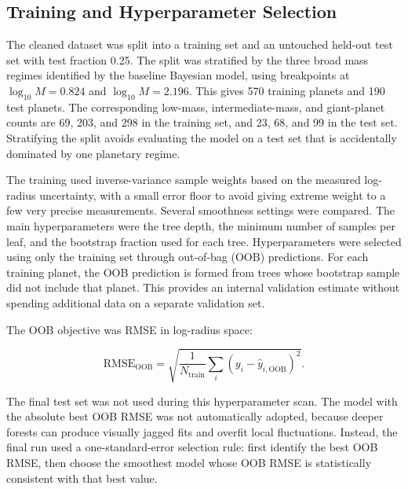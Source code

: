 \documentclass{article}
\numberwithin{equation}{section}
\begin{document}
\subsection{Training and Hyperparameter Selection}

The cleaned dataset was split into a training set and an untouched held-out test set with test fraction 0.25. The split was stratified by the three broad mass regimes identified by the baseline Bayesian model, using breakpoints at $\log_{10}M=0.824$ and $\log_{10}M=2.196$. This gives 570 training planets and 190 test planets. The corresponding low-mass, intermediate-mass, and giant-planet counts are 69, 203, and 298 in the training set, and 23, 68, and 99 in the test set. Stratifying the split avoids evaluating the model on a test set that is accidentally dominated by one planetary regime.

The training used inverse-variance sample weights based on the measured log-radius uncertainty, with a small error floor to avoid giving extreme weight to a few very precise measurements. Several smoothness settings were compared. The main hyperparameters were the tree depth, the minimum number of samples per leaf, and the bootstrap fraction used for each tree. Hyperparameters were selected using only the training set through out-of-bag (OOB) predictions. For each training planet, the OOB prediction is formed from trees whose bootstrap sample did not include that planet. This provides an internal validation estimate without spending additional data on a separate validation set.

The OOB objective was RMSE in log-radius space:

\begin{equation}
\mathrm{RMSE}_{\mathrm{OOB}}
=
\sqrt{
\frac{1}{N_{\mathrm{train}}}
\sum_i
\left(y_i-\hat{y}_{i,\mathrm{OOB}}\right)^2
}.
\end{equation}

The final test set was not used during this hyperparameter scan. The model with the absolute best OOB RMSE was not automatically adopted, because deeper forests can produce visually jagged fits and overfit local fluctuations. Instead, the final run used a one-standard-error selection rule: first identify the best OOB RMSE, then choose the smoothest model whose OOB RMSE is statistically consistent with that best value.
\end{document}
